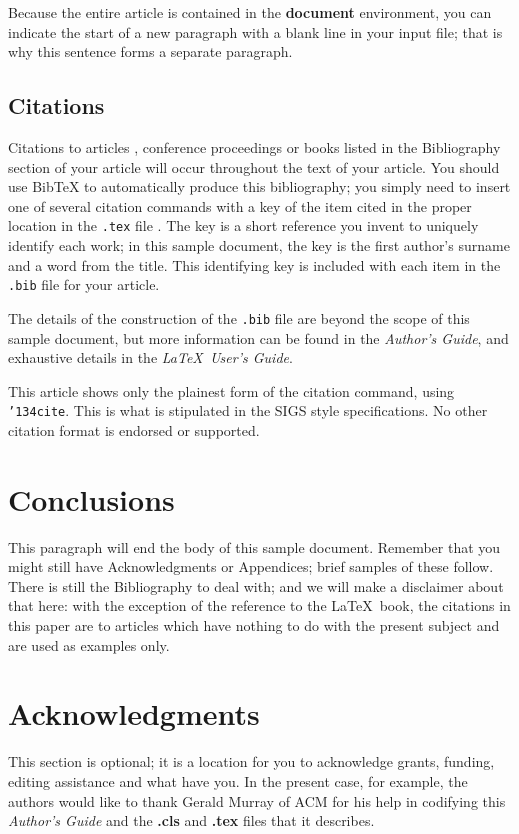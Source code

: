 \documentclass{sig-alternate}
\begin{document}
Because the entire article is contained in
the \textbf{document} environment, you can indicate the
start of a new paragraph with a blank line in your
input file; that is why this sentence forms a separate paragraph.

\subsection{Citations}
Citations to articles \cite{bowman:reasoning,
clark:pct, braams:babel, herlihy:methodology},
conference proceedings \cite{clark:pct} or
books \cite{salas:calculus, Lamport:LaTeX} listed
in the Bibliography section of your
article will occur throughout the text of your article.
You should use BibTeX to automatically produce this bibliography;
you simply need to insert one of several citation commands with
a key of the item cited in the proper location in
the \texttt{.tex} file \cite{Lamport:LaTeX}.
The key is a short reference you invent to uniquely
identify each work; in this sample document, the key is
the first author's surname and a
word from the title.  This identifying key is included
with each item in the \texttt{.bib} file for your article.

The details of the construction of the \texttt{.bib} file
are beyond the scope of this sample document, but more
information can be found in the \textit{Author's Guide},
and exhaustive details in the \textit{\LaTeX\ User's
Guide}\cite{Lamport:LaTeX}.

This article shows only the plainest form
of the citation command, using \texttt{{\char'134}cite}.
This is what is stipulated in the SIGS style specifications.
No other citation format is endorsed or supported.

\section{Conclusions}
This paragraph will end the body of this sample document.
Remember that you might still have Acknowledgments or
Appendices; brief samples of these
follow.  There is still the Bibliography to deal with; and
we will make a disclaimer about that here: with the exception
of the reference to the \LaTeX\ book, the citations in
this paper are to articles which have nothing to
do with the present subject and are used as
examples only.

\section{Acknowledgments}
This section is optional; it is a location for you
to acknowledge grants, funding, editing assistance and
what have you.  In the present case, for example, the
authors would like to thank Gerald Murray of ACM for
his help in codifying this \textit{Author's Guide}
and the \textbf{.cls} and \textbf{.tex} files that it describes.

%

\end{document}
